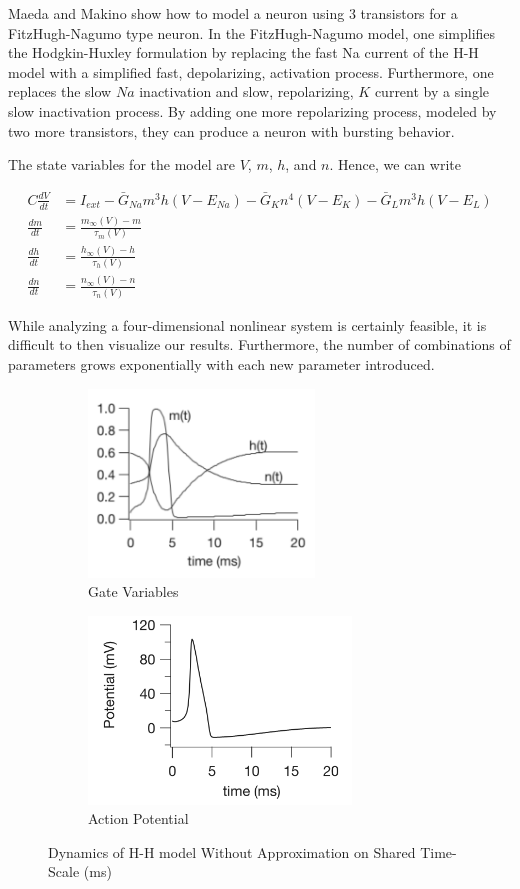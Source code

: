 \documentclass[12]{book}
\newcommand\0{\mathbf{0}}
\newcommand\<{\langle}
\renewcommand\>{\rangle}
\begin{document}
Maeda and Makino \cite{maeda2000pulse} show how to model a neuron using 3 transistors for a FitzHugh-Nagumo type neuron. In the FitzHugh-Nagumo model, one simplifies the Hodgkin-Huxley formulation by replacing the fast Na current of the H-H model with a simplified fast, depolarizing, activation process. Furthermore, one replaces the slow $Na$ inactivation and slow, repolarizing, $K$ current by a single slow inactivation process. By adding one more repolarizing process, modeled by two more transistors, they can produce a neuron with bursting behavior. 

The state variables for the model are $V$, $m$, $h$, and $n$. Hence, we can write

\begin{align*}
    C\frac{dV}{dt} &= I_{ext} -\bar{G}_{Na}m^3h(V-E_{Na}) -\bar{G}_{K}n^4(V-E_{K})  -\bar{G}_{L}m^3h(V-E_{L}) \\
    \frac{dm}{dt} &= \frac{m_{\infty}(V)-m}{\tau_m(V)} \\
    \frac{dh}{dt} &= \frac{h_{\infty}(V)-h}{\tau_h(V)} \\
    \frac{dn}{dt} &= \frac{n_{\infty}(V)-n}{\tau_n(V)} 
\end{align*}

While analyzing a four-dimensional nonlinear system is certainly feasible, it is difficult to then visualize our results. Furthermore, the number of combinations of parameters grows exponentially with each new parameter introduced.

\begin{figure}[h]
\centering
\begin{subfigure}{.5\textwidth}
	\centering
	\includegraphics[height=5cm]{keener1.png}
	\caption{Gate Variables}
\end{subfigure}%
\begin{subfigure}{.5\textwidth}
	\centering
	\includegraphics[height=5cm]{keener2.png}
	\caption{Action Potential}
\end{subfigure}
	\caption{Dynamics of H-H model Without Approximation on Shared Time-Scale (ms)}
	\label{fig:keen}
\end{figure}
\end{document}
